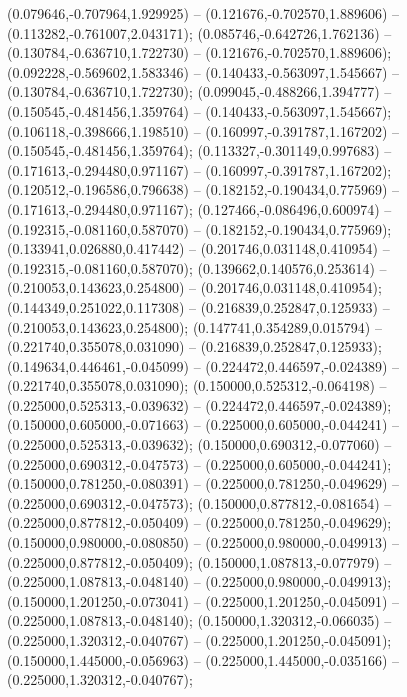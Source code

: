  (0.079646,-0.707964,1.929925) -- (0.121676,-0.702570,1.889606) -- (0.113282,-0.761007,2.043171);
 (0.085746,-0.642726,1.762136) -- (0.130784,-0.636710,1.722730) -- (0.121676,-0.702570,1.889606);
 (0.092228,-0.569602,1.583346) -- (0.140433,-0.563097,1.545667) -- (0.130784,-0.636710,1.722730);
 (0.099045,-0.488266,1.394777) -- (0.150545,-0.481456,1.359764) -- (0.140433,-0.563097,1.545667);
 (0.106118,-0.398666,1.198510) -- (0.160997,-0.391787,1.167202) -- (0.150545,-0.481456,1.359764);
 (0.113327,-0.301149,0.997683) -- (0.171613,-0.294480,0.971167) -- (0.160997,-0.391787,1.167202);
 (0.120512,-0.196586,0.796638) -- (0.182152,-0.190434,0.775969) -- (0.171613,-0.294480,0.971167);
 (0.127466,-0.086496,0.600974) -- (0.192315,-0.081160,0.587070) -- (0.182152,-0.190434,0.775969);
 (0.133941,0.026880,0.417442) -- (0.201746,0.031148,0.410954) -- (0.192315,-0.081160,0.587070);
 (0.139662,0.140576,0.253614) -- (0.210053,0.143623,0.254800) -- (0.201746,0.031148,0.410954);
 (0.144349,0.251022,0.117308) -- (0.216839,0.252847,0.125933) -- (0.210053,0.143623,0.254800);
 (0.147741,0.354289,0.015794) -- (0.221740,0.355078,0.031090) -- (0.216839,0.252847,0.125933);
 (0.149634,0.446461,-0.045099) -- (0.224472,0.446597,-0.024389) -- (0.221740,0.355078,0.031090);
 (0.150000,0.525312,-0.064198) -- (0.225000,0.525313,-0.039632) -- (0.224472,0.446597,-0.024389);
 (0.150000,0.605000,-0.071663) -- (0.225000,0.605000,-0.044241) -- (0.225000,0.525313,-0.039632);
 (0.150000,0.690312,-0.077060) -- (0.225000,0.690312,-0.047573) -- (0.225000,0.605000,-0.044241);
 (0.150000,0.781250,-0.080391) -- (0.225000,0.781250,-0.049629) -- (0.225000,0.690312,-0.047573);
 (0.150000,0.877812,-0.081654) -- (0.225000,0.877812,-0.050409) -- (0.225000,0.781250,-0.049629);
 (0.150000,0.980000,-0.080850) -- (0.225000,0.980000,-0.049913) -- (0.225000,0.877812,-0.050409);
 (0.150000,1.087813,-0.077979) -- (0.225000,1.087813,-0.048140) -- (0.225000,0.980000,-0.049913);
 (0.150000,1.201250,-0.073041) -- (0.225000,1.201250,-0.045091) -- (0.225000,1.087813,-0.048140);
 (0.150000,1.320312,-0.066035) -- (0.225000,1.320312,-0.040767) -- (0.225000,1.201250,-0.045091);
 (0.150000,1.445000,-0.056963) -- (0.225000,1.445000,-0.035166) -- (0.225000,1.320312,-0.040767);
